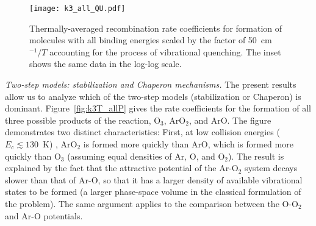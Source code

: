\documentclass[aps,prl,twocolumn,showpacs,preprintnumbers,amsmath,amssymb,floatfix]{revtex4-2}
\begin{document}
\begin{figure}
	\centering
	\texttt{[image: k3\_all\_QU.pdf]}
	\caption{Thermally-averaged recombination rate coefficients for formation of molecules with all binding energies scaled by the factor of 50~cm$^{-1}/T$ accounting for the process of vibrational quenching. The inset  shows the same data in the log-log scale.}
	\label{fig:k3T_QU}
\end{figure}
% 
% 
% 

{\it Two-step models: stabilization and Chaperon mechanisms.} The present results allow us to analyze which of the two-step models (stabilization or Chaperon) is dominant. Figure~\ref{fig:k3T_allP} gives the rate coefficients for the formation of all three possible products of the reaction, O$_3$, ArO$_2$, and ArO. The figure demonstrates two distinct characteristics: First, at low collision energies ($E_c\lesssim 130$~K) \cite{Mirahmadi2021, Mirahmadi2021a},  ArO$_2$ is formed more quickly than ArO, which is formed more quickly than O$_3$ (assuming equal densities of Ar, O, and O$_2$). The result is explained by the fact that the attractive potential of the Ar-O$_2$ system decays slower than that of Ar-O, so that it has a larger density of available vibrational states to be formed (a larger phase-space volume in the classical formulation of the problem). The same argument applies to the comparison between the O-O$_2$ and Ar-O potentials. 
\end{document}
